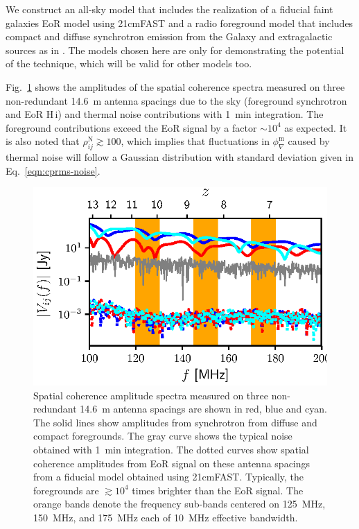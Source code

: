 \documentclass[
reprint,
superscriptaddress,
amsmath,
amssymb,
aps,
prd
]{revtex4-1}
\newcommand{\HI}{H\,{\sc i}}
\begin{document}
We construct an all-sky model that includes the realization of a fiducial {\sc faint galaxies} EoR model \cite{gre17b} using 21cmFAST \cite{mes11} and a radio foreground model that includes compact and diffuse synchrotron emission from the Galaxy and extragalactic sources as in \cite{thy15a}. The models chosen here are only for demonstrating the potential of the technique, which will be valid for other models too.

Fig.~\ref{fig:vis-spectra} shows the amplitudes of the spatial coherence spectra measured on three non-redundant 14.6~m antenna spacings due to the sky (foreground synchrotron and EoR \HI) and thermal noise contributions with 1~min integration. The foreground contributions exceed the EoR signal by a factor $\sim 10^4$ as expected. It is also noted that $\rho_{ij}^\textrm{N} \gtrsim 100$, which implies that fluctuations in $\phi_\nabla^\textrm{m}$ caused by thermal noise will follow a Gaussian distribution with standard deviation given in Eq.~\ref{eqn:cprms-noise}.

\begin{figure}[htb]
\includegraphics[width=\linewidth]{visamp_spectra_asm_eor_noise}
\caption{Spatial coherence amplitude spectra measured on three non-redundant 14.6~m antenna spacings are shown in red, blue and cyan. The solid lines show amplitudes from synchrotron from diffuse and compact foregrounds. The gray curve shows the typical noise obtained with 1~min integration. The dotted curves show spatial coherence amplitudes from EoR signal on these antenna spacings from a fiducial model obtained using 21cmFAST. Typically, the foregrounds are $\gtrsim 10^4$ times brighter than the EoR signal. The orange bands denote the frequency sub-bands centered on 125~MHz, 150~MHz, and 175~MHz each of 10~MHz effective bandwidth. \label{fig:vis-spectra}}
\end{figure}
\end{document}
